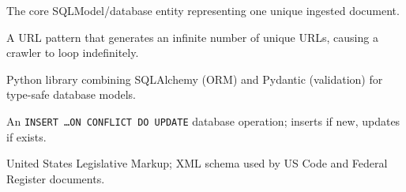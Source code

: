 \documentclass[12pt,a4paper]{article}
\begin{document}
\begin{description}[leftmargin=3.5cm, font=\normalfont\bfseries]
  \item[RawDocument] The core SQLModel/database entity representing one unique ingested document.
  \item[spider trap] A URL pattern that generates an infinite number of unique URLs, causing a crawler to loop indefinitely.
  \item[SQLModel] Python library combining SQLAlchemy (ORM) and Pydantic (validation) for type-safe database models.
  \item[upsert] An \texttt{INSERT \ldots ON CONFLICT DO UPDATE} database operation; inserts if new, updates if exists.
  \item[USLM] United States Legislative Markup; XML schema used by US Code and Federal Register documents.
\end{description}
\end{document}
